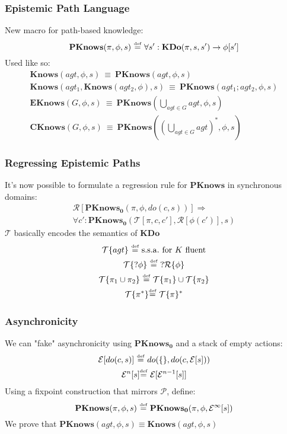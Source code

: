\documentclass{beamer}
\newcommand{\isdef}{\hbox{$\stackrel{\mbox{\tiny def}}{=}$}}
\newcommand{\Reg}{\mathcal{R}}
\newcommand{\Pst}{\mathcal{P}}
\newcommand{\Trn}{\mathcal{T}}
\begin{document}
\begin{frame}
\frametitle{Epistemic Path Language}
New macro for path-based knowledge:
\begin{equation*}
\mathbf{PKnows}(\pi,\phi,s)\ \isdef\ \forall s': \mathbf{KDo}(\pi,s,s') \rightarrow \phi[s']
\end{equation*}
Used like so:
\begin{gather*}
\mathbf{Knows}(agt,\phi,s)\ \equiv\ \mathbf{PKnows}(agt,\phi,s)\\
\mathbf{Knows}(agt_1,\mathbf{Knows}(agt_2,\phi),s)\ \equiv\ \mathbf{PKnows}(agt_1 ; agt_2,\phi,s)\\
\mathbf{EKnows}(G,\phi,s)\ \equiv\ \mathbf{PKnows}(\bigcup_{agt \in G}agt,\phi,s)\\
\mathbf{CKnows}(G,\phi,s)\ \equiv\ \mathbf{PKnows}((\bigcup_{agt \in G}agt)^*,\phi,s)
\end{gather*}
\end{frame}

\begin{frame}
\frametitle{Regressing Epistemic Paths}
It's now possible to formulate a regression rule for $\mathbf{PKnows}$ in synchronous domains:
\begin{multline*}
\Reg[\mathbf{PKnows_0}(\pi,\phi,do(c,s))] \Rightarrow \\
 \forall c': \mathbf{PKnows_0}(\Trn[\pi,c,c'],\Reg[\phi(c')],s)
\end{multline*}
$\mathcal{T}$ basically encodes the semantics of $\mathbf{KDo}$
\begin{gather*}
\mathcal{T}\{agt\}\ \isdef\ \mathrm{s.s.a.\ for}\ K\ \mathrm{fluent} \\
\mathcal{T}\{?\phi\}\ \isdef\ ?\mathcal{R}\{\phi\} \\
\mathcal{T}\{\pi_1\cup\pi_2\}\ \isdef\ \mathcal{T}\{\pi_1\}\cup\mathcal{T}\{\pi_2\} \\
\mathcal{T}\{\pi^*\} \isdef\ \mathcal{T}\{\pi\}^*
\end{gather*}
\end{frame}

\begin{frame}
\frametitle{Asynchronicity}
We can "fake" asynchronicity using $\mathbf{PKnows_0}$ and a stack of empty actions:
\begin{gather*}
\mathcal{E}[do(c,s)]\ \isdef\ do(\{\},do(c,\mathcal{E}[s])) \\
\mathcal{E}^n[s] \isdef\ \mathcal{E}[\mathcal{E}^{n-1}[s]]
\end{gather*}
Using a fixpoint construction that mirrors $\Pst$, define:
\begin{equation*}
\mathbf{PKnows}(\pi,\phi,s)\ \isdef\ \mathbf{PKnows_0}(\pi,\phi,\mathcal{E}^{\infty}[s])
\end{equation*}
We prove that $\mathbf{PKnows}(agt,\phi,s) \equiv \mathbf{Knows}(agt,\phi,s)$
\end{frame}
\end{document}
